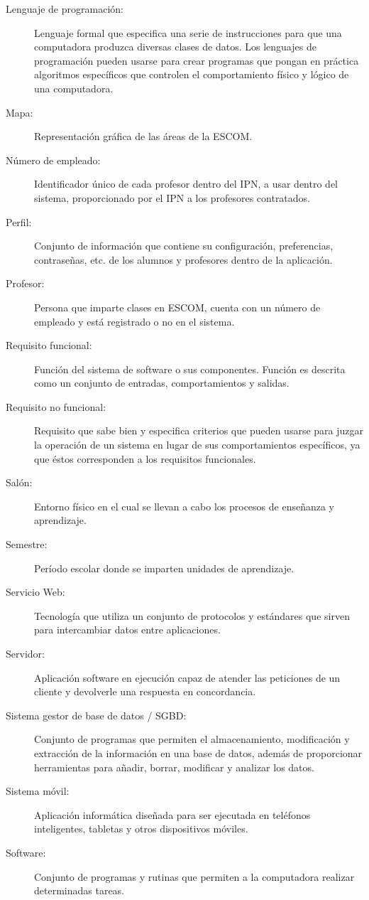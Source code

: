 \begin{description}
	\item[Lenguaje de programación:] Lenguaje formal que especifica una serie de instrucciones para que una computadora produzca diversas clases de datos. Los lenguajes de programación pueden usarse para crear programas que pongan en práctica algoritmos específicos que controlen el comportamiento físico y lógico de una computadora.

	\item[Mapa:] Representación gráfica de las áreas de la ESCOM.
	
	\item[Número de empleado:] Identificador único de cada profesor dentro del IPN, a usar dentro del sistema, proporcionado por el IPN a los profesores contratados.

	\item[Perfil:] Conjunto de información que contiene su configuración, preferencias, contraseñas, etc. de los alumnos y profesores dentro de la aplicación.
	\item[Profesor:] Persona que imparte clases en ESCOM, cuenta con un número de empleado y está registrado o no en el sistema.
	
	\item[Requisito funcional:] Función del sistema de software o sus componentes. Función es descrita como un conjunto de entradas, comportamientos y salidas.
	\item[Requisito no funcional:] Requisito que sabe bien y especifica criterios que pueden usarse para juzgar la operación de un sistema en lugar de sus comportamientos específicos, ya que éstos corresponden a los requisitos funcionales. 

	\item[Salón:] Entorno físico en el cual se llevan a cabo los procesos de enseñanza y aprendizaje.
	\item[Semestre:] Período escolar donde se imparten unidades de aprendizaje.
	\item[Servicio Web:] Tecnología que utiliza un conjunto de protocolos y estándares que sirven para intercambiar datos entre aplicaciones.
	\item[Servidor:] Aplicación software en ejecución capaz de atender las peticiones de un cliente y devolverle una respuesta en concordancia.
	\item[Sistema gestor de base de datos / SGBD:] Conjunto de programas que permiten el almacenamiento, modificación y extracción de la información en una base de datos, además de proporcionar herramientas para añadir, borrar, modificar y analizar los datos. 
	\item[Sistema móvil:] Aplicación informática diseñada para ser ejecutada en teléfonos inteligentes, tabletas y otros dispositivos móviles. 
	\item[Software:] Conjunto de programas y rutinas que permiten a la computadora realizar determinadas tareas.


\end{description}
